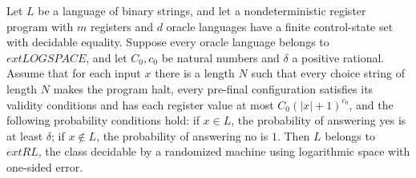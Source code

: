 \begin{theorem}
\label{Complexity.LogProg.narm_mem_RL}
\leanok
{}
Let $L$ be a language of binary strings, and let a nondeterministic register program
with $m$ registers and $d$ oracle languages have a finite control-state set with
decidable equality. Suppose every oracle language belongs to $	ext{LOGSPACE}$, and let
$C_0,c_0$ be natural numbers and $\delta$ a positive rational. Assume that for each
input $x$ there is a length $N$ such that every choice string of length $N$ makes the
program halt, every pre-final configuration satisfies its validity conditions and has
each register value at most $C_0(|x|+1)^{c_0}$, and the following probability conditions
hold: if $x\in L$, the probability of answering yes is at least $\delta$; if $x\notin
L$, the probability of answering no is $1$. Then $L$ belongs to $	ext{RL}$, the class
decidable by a randomized machine using logarithmic space with one-sided error.
\end{theorem}
